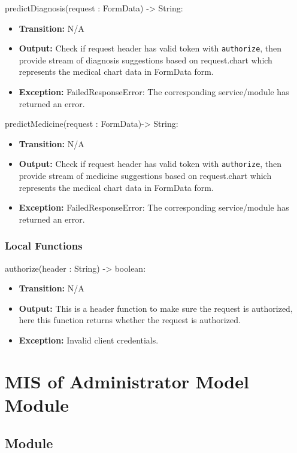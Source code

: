 \documentclass[12pt, titlepage]{article}
\begin{document}
\noindent predictDiagnosis(request : FormData) -> String:
\begin{itemize}
    \item \textbf{Transition:} N/A
    \item \textbf{Output:} Check if request header has valid token with \texttt{authorize}, then provide stream of diagnosis suggestions based on request.chart which represents the medical chart data in FormData form.
    \item \textbf{Exception:} FailedResponseError: The corresponding service/module has returned an error.
\end{itemize}

\noindent predictMedicine(request : FormData)-> String:
\begin{itemize}
    \item \textbf{Transition:} N/A
    \item \textbf{Output:} Check if request header has valid token with \texttt{authorize}, then provide stream of medicine suggestions based on request.chart which represents the medical chart data in FormData form.
    \item \textbf{Exception:} FailedResponseError: The corresponding service/module has returned an error.
\end{itemize}

\subsubsection{Local Functions}

\noindent authorize(header : String) -> boolean:
\begin{itemize}
    \item \textbf{Transition:} N/A
    \item \textbf{Output:} This is a header function to make sure the request is authorized, here this function returns whether the request is authorized.
    \item \textbf{Exception:} Invalid client credentials.
\end{itemize}

\newpage

\section{MIS of Administrator Model Module } \label{Admin_Model_Module}

\subsection{Module}
\end{document}
